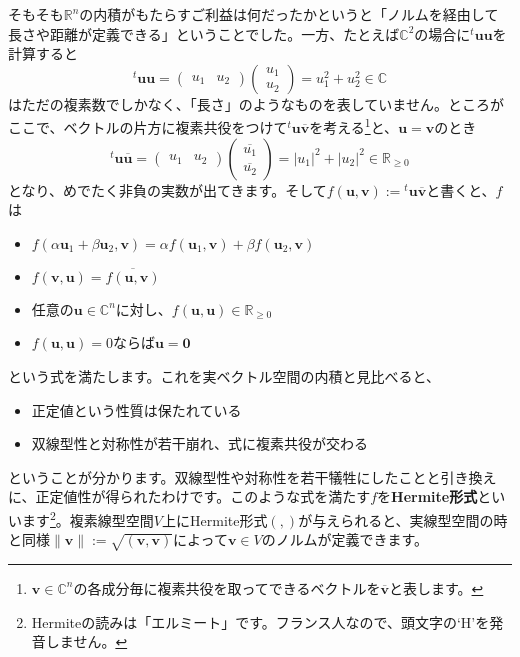 そもそも$\mathbb{R}^n$の内積がもたらすご利益は何だったかというと「ノルムを経由して長さや距離が定義できる」ということでした。一方、たとえば$\mathbb{C}^2$の場合に${}^t\bm{u} \bm{u}$を計算すると
\[
{}^t\bm{u} \bm{u} = 
\begin{pmatrix}
u_1 & u_2
\end{pmatrix}
\begin{pmatrix}
u_1 \\
u_2
\end{pmatrix}
= u_1^2 + u_2^2 \in \mathbb{C}
\]
はただの複素数でしかなく、「長さ」のようなものを表していません。ところがここで、ベクトルの片方に複素共役をつけて${}^t\bm{u}\overline{\bm{v}}$を考える\footnote{$\bm{v}\in\mathbb{C}^n$の各成分毎に複素共役を取ってできるベクトルを$\overline{\bm{v}}$と表します。}と、$\bm{u} = \bm{v}$のとき
\[
{}^t\bm{u}\overline{\bm{u}}
=
\begin{pmatrix}
u_1 & u_2
\end{pmatrix}
\begin{pmatrix}
\overline{u_1} \\
\overline{u_2}
\end{pmatrix}
= |u_1|^2 + |u_2|^2 \in \mathbb{R}_{\geq 0}
\]
となり、めでたく非負の実数が出てきます。そして$f(\bm{u}, \bm{v}) := {}^t\bm{u}\overline{\bm{v}}$と書くと、$f$は
\begin{itemize}
\item $f(\alpha \bm{u}_1 + \beta \bm{u}_2, \bm{v}) = \alpha f(\bm{u}_1, \bm{v}) + \beta f(\bm{u}_2, \bm{v}) $
\item $f(\bm{v}, \bm{u}) = \overline{f(\bm{u}, \bm{v})}$
\item 任意の$\bm{u} \in \mathbb{C}^n$に対し、$f(\bm{u}, \bm{u}) \in \mathbb{R}_{\geq 0}$
\item $f(\bm{u}, \bm{u}) = 0$ならば$\bm{u} = \bm{0}$
\end{itemize}
という式を満たします。これを実ベクトル空間の内積と見比べると、
\begin{itemize}
\item 正定値という性質は保たれている
\item 双線型性と対称性が若干崩れ、式に複素共役が交わる
\end{itemize}
ということが分かります。双線型性や対称性を若干犠牲にしたことと引き換えに、正定値性が得られたわけです。このような式を満たす$f$を\textbf{Hermite形式}といいます\footnote{Hermiteの読みは「エルミート」です。フランス人なので、頭文字の`H'を発音しません。}。複素線型空間$V$上にHermite形式$(, )$が与えられると、実線型空間の時と同様$\|\bm{v}\| := \sqrt{(\bm{v}, \bm{v})}$によって$\bm{v} \in V$のノルムが定義できます。

